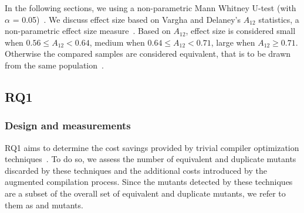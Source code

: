 In the following sections, we
using a non-parametric Mann Whitney U-test (with $\alpha$ = 0.05)~\cite{Arcuri:practicalGuide:ICSE:2015}.  We discuss effect size based on Vargha and Delaney’s $A_{12}$ statistics, a non-parametric effect size measure~\cite{VDA,Arcuri:practicalGuide:ICSE:2015}. Based on $A_{12}$, effect size is considered small when $0.56 \le A_{12} < 0.64$, medium when $0.64 \le A_{12} < 0.71$, large when $A_{12} \ge 0.71$. Otherwise the compared samples are considered equivalent, that is to be drawn from the same population~\cite{VDA}.


% 







%

\subsection{RQ1}




\subsubsection{Design and measurements}

RQ1 aims to determine the cost savings provided by
trivial compiler optimization techniques~\cite{papadakis2015trivial,kintis2017detecting}. To do so, we assess the number of equivalent and duplicate mutants discarded by these techniques and the additional costs introduced by the augmented compilation process. Since the mutants detected by these techniques
are a subset of
the overall set of equivalent and duplicate mutants, we refer to them as  and  mutants.

